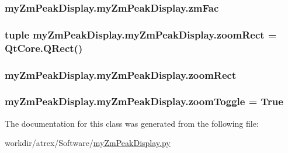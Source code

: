 \hypertarget{classmy_zm_peak_display_1_1my_zm_peak_display_a3418f94ca8d8f74f38e83a9857cacd5b}{
\subsubsection[{zm\-Fac}]{\setlength{\rightskip}{0pt plus 5cm}my\-Zm\-Peak\-Display.\-my\-Zm\-Peak\-Display.\-zm\-Fac}}\label{classmy_zm_peak_display_1_1my_zm_peak_display_a3418f94ca8d8f74f38e83a9857cacd5b}
\hypertarget{classmy_zm_peak_display_1_1my_zm_peak_display_a43b75e7b7d508ce23a9f4e663917fa01}{
\subsubsection[{zoom\-Rect}]{\setlength{\rightskip}{0pt plus 5cm}tuple my\-Zm\-Peak\-Display.\-my\-Zm\-Peak\-Display.\-zoom\-Rect = Qt\-Core.\-Q\-Rect()\hspace{0.3cm}{\ttfamily [static]}}}\label{classmy_zm_peak_display_1_1my_zm_peak_display_a43b75e7b7d508ce23a9f4e663917fa01}
\hypertarget{classmy_zm_peak_display_1_1my_zm_peak_display_aead8ab13c78f41a35434760be199264a}{
\subsubsection[{zoom\-Rect}]{\setlength{\rightskip}{0pt plus 5cm}my\-Zm\-Peak\-Display.\-my\-Zm\-Peak\-Display.\-zoom\-Rect}}\label{classmy_zm_peak_display_1_1my_zm_peak_display_aead8ab13c78f41a35434760be199264a}
\hypertarget{classmy_zm_peak_display_1_1my_zm_peak_display_ac2ffc7ced35826e8eed43f5abbf0e3d0}{
\subsubsection[{zoom\-Toggle}]{\setlength{\rightskip}{0pt plus 5cm}my\-Zm\-Peak\-Display.\-my\-Zm\-Peak\-Display.\-zoom\-Toggle = True\hspace{0.3cm}{\ttfamily [static]}}}\label{classmy_zm_peak_display_1_1my_zm_peak_display_ac2ffc7ced35826e8eed43f5abbf0e3d0}


The documentation for this class was generated from the following file\-:\begin{DoxyCompactItemize}
\item 
workdir/atrex/\-Software/\hyperlink{my_zm_peak_display_8py}{my\-Zm\-Peak\-Display.\-py}\end{DoxyCompactItemize}
